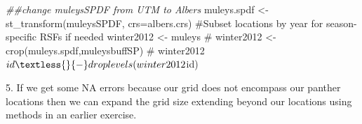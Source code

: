 \documentclass[
  letterpaper,
]{book}
\newenvironment{Shaded}{\begin{snugshade}}{\end{snugshade}}
\newcommand{\AttributeTok}[1]{\textcolor[rgb]{0.40,0.45,0.13}{#1}}
\newcommand{\CommentTok}[1]{\textcolor[rgb]{0.37,0.37,0.37}{#1}}
\newcommand{\DecValTok}[1]{\textcolor[rgb]{0.68,0.00,0.00}{#1}}
\newcommand{\DocumentationTok}[1]{\textcolor[rgb]{0.37,0.37,0.37}{\textit{#1}}}
\newcommand{\FunctionTok}[1]{\textcolor[rgb]{0.28,0.35,0.67}{#1}}
\newcommand{\NormalTok}[1]{\textcolor[rgb]{0.00,0.23,0.31}{#1}}
\newcommand{\OtherTok}[1]{\textcolor[rgb]{0.00,0.23,0.31}{#1}}
\newcommand{\SpecialCharTok}[1]{\textcolor[rgb]{0.37,0.37,0.37}{#1}}
\begin{document}
\begin{Shaded}
\begin{Highlighting}[]
\DocumentationTok{\#\#change muleysSPDF from UTM to Albers}
\NormalTok{muleys.spdf }\OtherTok{\textless{}{-}}\FunctionTok{st\_transform}\NormalTok{(muleysSPDF, }\AttributeTok{crs=}\NormalTok{albers.crs)}
\CommentTok{\#Subset locations by year for season{-}specific RSFs if needed}
\NormalTok{winter2012 }\OtherTok{\textless{}{-}}\NormalTok{ muleys}
\CommentTok{\# winter2012 \textless{}{-} crop(muleys.spdf,muleysbuffSP)}
\CommentTok{\# winter2012$id \textless{}{-} droplevels(winter2012$id)}
\end{Highlighting}
\end{Shaded}

5. If we get some NA errors because our grid does not encompass our
panther locations then we can expand the grid size extending beyond our
locations using methods in an earlier exercise.

\begin{Shaded}
\end{Shaded}
\end{document}
